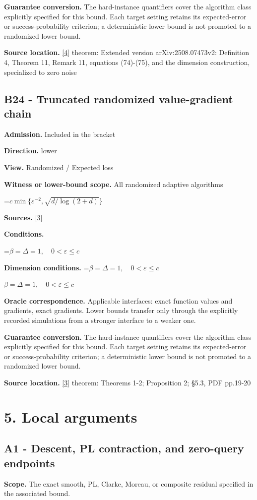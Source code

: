 \documentclass[10pt,a4paper]{article}
\newcommand{\AtlasMath}[1]{\par\begingroup\centering\setbox0=\hbox{$\displaystyle #1$}\ifdim\wd0>1.4\linewidth\typeout{ATLAS WIDE FORMULA: \the\wd0}\fi\ifdim\wd0>\linewidth\resizebox{\linewidth}{!}{\box0}\else\box0\fi\par\endgroup}
\newcommand{\AtlasInlineMath}[1]{\begingroup\setbox0=\hbox{$#1$}\ifdim\wd0>.4\linewidth\endgroup\AtlasMath{#1}\else\endgroup$#1$\fi}
\begin{document}
\textbf{Guarantee conversion.} The hard-instance quantifiers cover the algorithm class explicitly specified for this bound. Each target setting retains its expected-error or success-probability criterion; a deterministic lower bound is not promoted to a randomized lower bound.

\textbf{Source location.} \href{https://proceedings.mlr.press/v313/liu26a.html}{[4]} theorem: Extended version arXiv:2508.07473v2: Definition 4, Theorem 11, Remark 11, equations (74)-(75), and the dimension construction, specialized to zero noise

\subsection{B24 - Truncated randomized value-gradient chain}
\textbf{Admission.} Included in the bracket

\textbf{Direction.} lower

\textbf{View.} Randomized / Expected loss

\textbf{Witness or lower-bound scope.} All randomized adaptive algorithms

\AtlasMath{c\min\{\varepsilon^{-2},\sqrt{d/\log(2+d)}\}}
\textbf{Sources.} \href{https://arxiv.org/pdf/1710.11606}{[3]}

\textbf{Conditions.} 


\AtlasMath{\beta=\Delta=1,\quad0<\varepsilon\le c}




\textbf{Dimension conditions.} \AtlasInlineMath{\beta=\Delta=1,\quad0<\varepsilon\le c}

\textbf{Oracle correspondence.} Applicable interfaces: exact function values and gradients, exact gradients. Lower bounds transfer only through the explicitly recorded simulations from a stronger interface to a weaker one.

\textbf{Guarantee conversion.} The hard-instance quantifiers cover the algorithm class explicitly specified for this bound. Each target setting retains its expected-error or success-probability criterion; a deterministic lower bound is not promoted to a randomized lower bound.

\textbf{Source location.} \href{https://arxiv.org/pdf/1710.11606}{[3]} theorem: Theorems 1-2; Proposition 2; §5.3, PDF pp.19-20

\section{5. Local arguments}
\subsection{A1 - Descent, PL contraction, and zero-query endpoints}
\textbf{Scope.} The exact smooth, PL, Clarke, Moreau, or composite residual specified in the associated bound.
\end{document}
